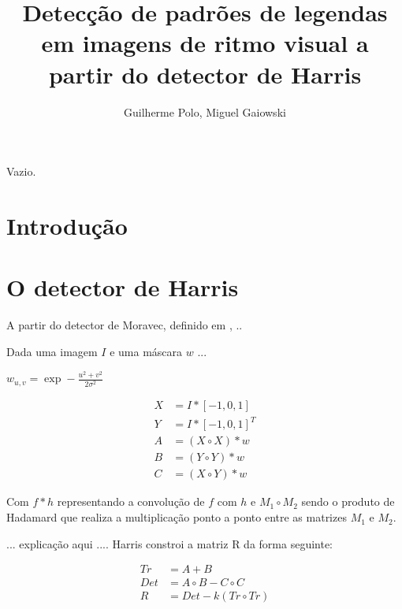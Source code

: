 \documentclass[12pt]{article}
\title{Detecção de padrões de legendas em imagens de ritmo visual a partir
do detector de Harris}
\author{Guilherme Polo\inst{1}, Miguel Gaiowski\inst{1}}
\begin{document}
\maketitle

\begin{resumo}
  Vazio.
\end{resumo}


\section{Introdução}

\cite{harris}


\section{O detector de Harris}

A partir do detector de Moravec, definido em \cite{moravec}, ..


Dada uma imagem $I$ e uma máscara $w$ ...

$w_{u,v} = \exp -\frac{u^2 + v^2}{2\sigma^2}$


\begin{align*}
  X & = I * [-1, 0, 1] \\
  Y & = I * [-1, 0, 1]^T \\
  A & = (X \circ X) * w \\
  B & = (Y \circ Y) * w \\
  C & = (X \circ Y) * w
\end{align*}

Com $f  * h$ representando  a convolução de  $f$ com $h$ e  $M_1 \circ
M_2$ sendo o  produto de Hadamard que realiza  a multiplicação ponto a
ponto entre as matrizes $M_1$ e $M_2$.

... explicação aqui .... Harris constroi a matriz R da forma seguinte:

\begin{align}
  Tr & = A + B \nonumber \\
  Det & = A \circ B - C \circ C \nonumber \\
  R & = Det - k (Tr \circ Tr) \label{REq}
\end{align}
\end{document}
